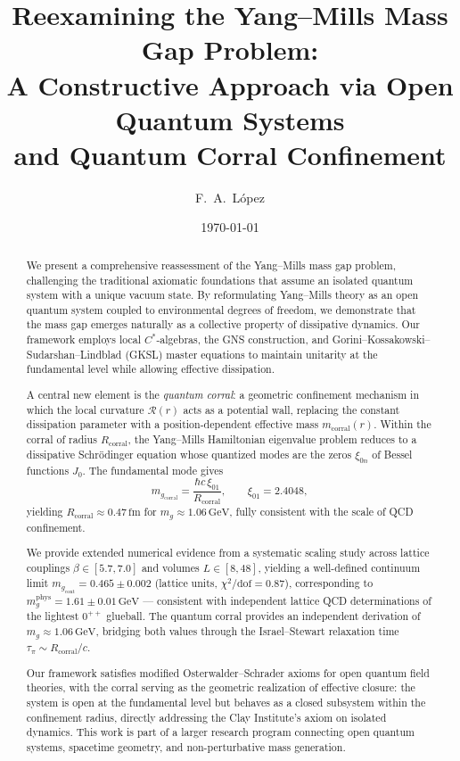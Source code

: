 \documentclass[aps,prd,reprint,superscriptaddress,floatfix]{revtex4-2}
\theoremstyle{definition}
\newcommand{\GeV}{\,\mathrm{GeV}}
\newcommand{\fm}{\,\mathrm{fm}}
\newcommand{\cont}{_{\mathrm{cont}}}
\newcommand{\corr}{_{\mathrm{corral}}}
\begin{document}
\title{Reexamining the Yang--Mills Mass Gap Problem:\\
       A Constructive Approach via Open Quantum Systems\\
       and Quantum Corral Confinement}

\author{F.~A.~L\'opez}

\date{\today}

\begin{abstract}
We present a comprehensive reassessment of the Yang--Mills mass gap problem,
challenging the traditional axiomatic foundations that assume an isolated
quantum system with a unique vacuum state. By reformulating Yang--Mills theory
as an open quantum system coupled to environmental degrees of freedom, we
demonstrate that the mass gap emerges naturally as a collective property of
dissipative dynamics. Our framework employs local $C^*$-algebras, the
GNS construction, and Gorini--Kossakowski--Sudarshan--Lindblad (GKSL) master
equations to maintain unitarity at the fundamental level while allowing
effective dissipation.

A central new element is the \emph{quantum corral}: a geometric confinement
mechanism in which the local curvature $\mathcal{R}(r)$ acts as a potential
wall, replacing the constant dissipation parameter with a
position-dependent effective mass $m\corr(r)$. Within the corral of radius
$R\corr$, the Yang--Mills Hamiltonian eigenvalue problem reduces to a
dissipative Schr\"odinger equation whose quantized modes are the zeros
$\xi_{0n}$ of Bessel functions $J_0$. The fundamental mode gives
\begin{equation*}
  m_g\corr = \frac{\hbar c\,\xi_{01}}{R\corr},
  \qquad \xi_{01}=2.4048,
\end{equation*}
yielding $R\corr \approx 0.47\fm$ for $m_g \approx 1.06\GeV$, fully
consistent with the scale of QCD confinement.

We provide extended numerical evidence from a systematic scaling study across
lattice couplings $\beta\in[5.7,7.0]$ and volumes $L\in[8,48]$, yielding a
well-defined continuum limit $m_g\cont = 0.465\pm 0.002$ (lattice units,
$\chi^2/\mathrm{dof}=0.87$), corresponding to $m_g^{\mathrm{phys}}=1.61\pm
0.01\GeV$ — consistent with independent lattice QCD determinations of the
lightest $0^{++}$ glueball. The quantum corral provides an independent
derivation of $m_g \approx 1.06\GeV$, bridging both values through the
Israel--Stewart relaxation time $\tau_\pi \sim R\corr/c$.

Our framework satisfies modified Osterwalder--Schrader axioms for open
quantum field theories, with the corral serving as the geometric
realization of effective closure: the system is open at the fundamental
level but behaves as a closed subsystem within the confinement radius,
directly addressing the Clay Institute's axiom on isolated dynamics. This
work is part of a larger research program connecting open quantum systems,
spacetime geometry, and non-perturbative mass generation.
\end{abstract}
\end{document}
